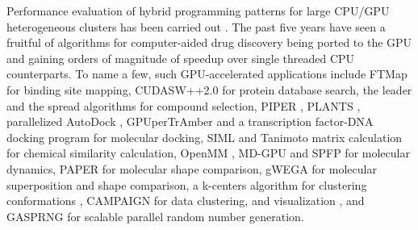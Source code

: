 Performance evaluation of hybrid programming patterns for large CPU/GPU heterogeneous clusters has been carried out \citep{1035}. The past five years have seen a fruitful of algorithms for computer-aided drug discovery being ported to the GPU and gaining orders of magnitude of speedup over single threaded CPU counterparts. To name a few, such GPU-accelerated applications include FTMap \citep{722} for binding site mapping, CUDASW++2.0 \citep{189} for protein database search, the leader and the spread algorithms \citep{750} for compound selection, PIPER \citep{723}, PLANTS \citep{779}, parallelized AutoDock \citep{696}, GPUperTrAmber \citep{1270} and a transcription factor-DNA docking program \citep{1267,1266} for molecular docking, SIML \citep{726} and Tanimoto matrix calculation \citep{881} for chemical similarity calculation, OpenMM \citep{373}, MD-GPU \citep{374} and SPFP \citep{1261} for molecular dynamics, PAPER \citep{491} for molecular shape comparison, gWEGA \citep{1388} for molecular superposition and shape comparison, a k-centers algorithm for clustering conformations \citep{1275}, CAMPAIGN \citep{932} for data clustering, and visualization \citep{986}, and GASPRNG \citep{1401} for scalable parallel random number generation.

\chapterend
